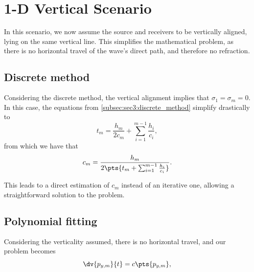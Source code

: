 \section{1-D Vertical Scenario}

In this scenario, we now assume the source and receivers to be vertically aligned, lying on the same vertical line. This simplifies the mathematical problem, as there is no horizontal travel of the wave's direct path, and therefore no refraction.

\subsection{Discrete method}

Considering the discrete method, the vertical alignment implies that $\sigma_1 = \sigma_m = 0$. In this case, the equations from \cref{subsec:sec3:discrete_method} simplify drastically to
\begin{equation}
	t_m = \frac{h_m}{2c_m} + \sum_{i=1}^{m-1} \frac{h_i}{c_i},
\end{equation}
from which we have that
\begin{equation}
	c_m = \frac{h_m}{2\pts{t_m + \sum_{i=1}^{m-1} \frac{h_i}{c_i}}}.
\end{equation}

This leads to a direct estimation of $c_m$ instead of an iterative one, allowing a straightforward solution to the problem.

%
%

\subsection{Polynomial fitting}
Considering the verticality assumed, there is no horizontal travel, and our problem becomes
\begin{equation}
	\dv{p_{y,m}}{t} = c\pts{p_{y,m}},
\end{equation}

